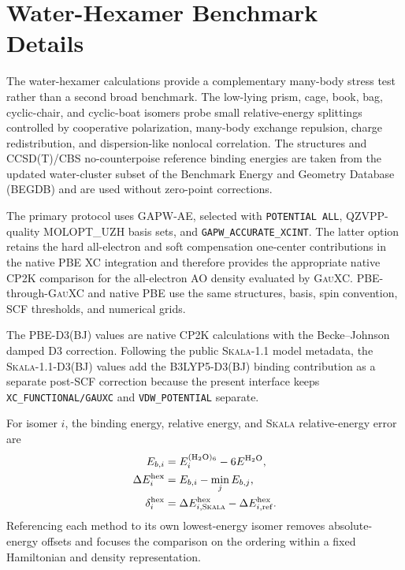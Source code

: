 \documentclass[10pt]{article}
\newcommand{\Skala}{\textsc{Skala}}
\newcommand{\GauXC}{\textsc{GauXC}}
\newcommand{\CPtwoK}{\textsc{CP2K}}
\newcommand{\GAPW}{\textsc{GAPW}}
\newcommand{\GAPWAE}{\GAPW{}-AE}
\begin{document}
\section{Water-Hexamer Benchmark Details}

\begingroup

The water-hexamer calculations provide a complementary many-body stress test rather than a second broad benchmark.  The low-lying prism, cage, book, bag, cyclic-chair, and cyclic-boat isomers probe small relative-energy splittings controlled by cooperative polarization, many-body exchange repulsion, charge redistribution, and dispersion-like nonlocal correlation.\cite{Xantheas2002,Santra2008,Bates2009,Manna2017WaterClusters}  The structures and CCSD(T)/CBS no-counterpoise reference binding energies are taken from the updated water-cluster subset of the Benchmark Energy and Geometry Database (BEGDB) and are used without zero-point corrections.\cite{Rezac2008BEGDB,Manna2017WaterClusters}

The primary protocol uses \GAPWAE{}, selected with \texttt{POTENTIAL ALL}, QZVPP-quality \textsc{MOLOPT\_UZH} basis sets,\cite{Mirhosseini2026UZH} and \texttt{GAPW\_ACCURATE\_XCINT}.  The latter option retains the hard all-electron and soft compensation one-center contributions in the native PBE XC integration and therefore provides the appropriate native \CPtwoK{} comparison for the all-electron AO density evaluated by \GauXC{}.  PBE-through-\GauXC{} and native PBE use the same structures, basis, spin convention, SCF thresholds, and numerical grids.

The PBE-D3(BJ) values are native \CPtwoK{} calculations with the Becke--Johnson damped D3 correction.\cite{Grimme2010DFTD3,Grimme2011D3BJ}  Following the public \Skala{}-1.1 model metadata, the \Skala{}-1.1-D3(BJ) values add the B3LYP5-D3(BJ) binding contribution as a separate post-SCF correction because the present interface keeps \texttt{XC\_FUNCTIONAL/\allowbreak GAUXC} and \texttt{VDW\_POTENTIAL} separate.

For isomer \(i\), the binding energy, relative energy, and \Skala{} relative-energy error are
\begin{align}
  E_{b,i}
  &=
  E_i^{(\mathrm H_2\mathrm O)_6}
  -
  6E^{\mathrm H_2\mathrm O},
  \label{eq:si_hexamer_binding}\\
  \Delta E_i^{\mathrm{hex}}
  &=
  E_{b,i}
  -
  \min_j E_{b,j},
  \label{eq:si_hexamer_relative}\\
  \delta_i^{\mathrm{hex}}
  &=
  \Delta E_{i,\Skala}^{\mathrm{hex}}
  -
  \Delta E_{i,\mathrm{ref}}^{\mathrm{hex}}.
  \label{eq:si_water_error}
\end{align}
Referencing each method to its own lowest-energy isomer removes absolute-energy offsets and focuses the comparison on the ordering within a fixed Hamiltonian and density representation.
\end{document}
